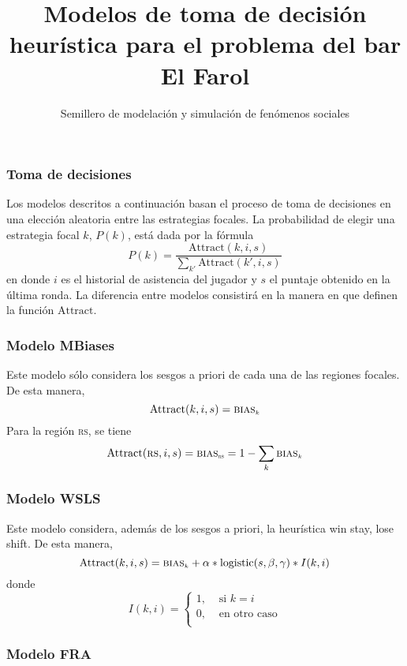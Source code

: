 \documentclass{article}
\title{Modelos de toma de decisión heurística para el problema del bar El Farol}
\author{Semillero de modelación y simulación de fenómenos sociales}
\date{}
\newcommand{\attrac}{\mbox{Attract}}
\newcommand{\logi}{\mbox{logistic}}
\newcommand{\bias}[1]{\ensuremath{\mbox{\textsc{bias}$_{\mbox{\tiny ${#1}$}}$}}}
\begin{document}
\subsubsection*{Toma de decisiones}

Los modelos descritos a continuación basan el proceso de toma de decisiones en una elección aleatoria entre las estrategias focales. La probabilidad de elegir una estrategia focal $k$, $P(k)$, está dada por la fórmula
%
\begin{equation}\label{eq:probabilidades}
P(k)=\frac{\attrac(k, i, s)}{\sum_{k'}\attrac(k',i,s)}
\end{equation}
%
en donde $i$ es el historial de asistencia del jugador y $s$ el puntaje obtenido en la última ronda. La diferencia entre modelos consistirá en la manera en que definen la función $\attrac$.

\subsubsection*{Modelo MBiases}

Este modelo sólo considera los sesgos a priori de cada una de las regiones focales. De esta manera,
%
\begin{equation}\label{eq:MBiases}
\attrac(k, i, s)=\bias{k}
\end{equation}
%
Para la región \textsc{rs}, se tiene 
%
\begin{equation}\label{eq:MBiases}
\attrac(\mbox{\textsc{rs}}, i, s)=\bias{\mbox{\textsc{rs}}} =  1-\sum_{k}\bias{k}
\end{equation}
%

\subsubsection*{Modelo WSLS}

Este modelo considera, además de los sesgos a priori, la heurística win stay, lose shift. De esta manera,
%
\begin{equation}\label{eq:WSLS}
\attrac(k, i, s)=\bias{k} + \alpha*\logi(s,\beta,\gamma)*I(k,i)
\end{equation}
%
donde
%
\[
I(k,i)=\begin{cases}
1,&\mbox{ si }k=i\\
0,&\mbox{ en otro caso}\\
\end{cases}
\]

\subsubsection*{Modelo FRA}
\end{document}
